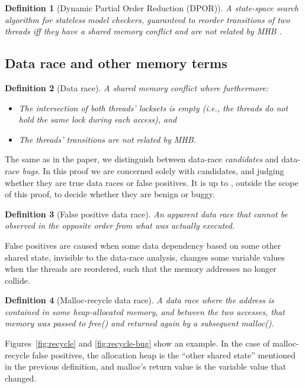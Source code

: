 \documentclass[pldi]{sigplanconf-pldi15}
\newtheorem{definition}{Definition}
\begin{document}
\begin{definition}[Dynamic Partial Order Reduction (DPOR)]
	A state-space search algorithm for stateless model checkers,
	guaranteed to reorder transitions of two threads
	iff they have a shared memory conflict and are not related by MHB \cite{dpor}.
	\label{def:dpor}
\end{definition}

\subsection{Data race and other memory terms}

\begin{definition}[Data race]
A shared memory conflict where furthermore:
\begin{itemize}
	\item The intersection of both threads' locksets is empty (i.e., the threads do not hold the same lock during each access), and
	\item The threads' transitions are not related by MHB.
\end{itemize}
\end{definition}

The same as in the paper, we distinguish between data-race {\em candidates} and data-race {\em bugs}.
In this proof we are concerned solely with candidates, and judging whether they are true data races or false positives.
It is up to \quicksand, outside the scope of this proof, to decide whether they are benign or buggy.

\begin{definition}[False positive data race]
	An apparent data race that cannot be observed in the opposite order from what was actually executed.
\end{definition}

False positives are caused when some data dependency based on some other shared state, invisible to the data-race analysis,
changes some variable values when the threads are reordered, such that the memory addresses no longer collide.

\begin{definition}[Malloc-recycle data race]
	A data race where the address is contained in some heap-allocated memory, and between the two accesses, that memory was passed to free() and returned again by a subsequent malloc().
\end{definition}

Figures~\ref{fig:recycle} and \ref{fig:recycle-bug} show an example.
In the case of malloc-recycle false positives, the allocation heap is the ``other shared state'' mentioned in the previous definition, and malloc's return value is the variable value that changed.
\end{document}
